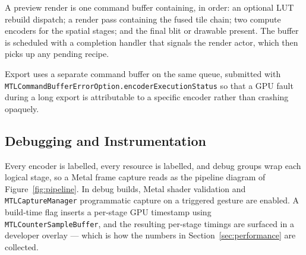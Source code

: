 A preview render is one command buffer containing, in order: an optional LUT
rebuild dispatch; a render pass containing the fused tile chain; two compute
encoders for the spatial stages; and the final blit or drawable present. The
buffer is scheduled with a completion handler that signals the render actor,
which then picks up any pending recipe.

Export uses a separate command buffer on the same queue, submitted with
\texttt{MTLCommandBufferErrorOption.\allowbreak{}encoderExecutionStatus} so that
a GPU fault
during a long export is attributable to a specific encoder rather than crashing
opaquely.

\subsection{Debugging and Instrumentation}

Every encoder is labelled, every resource is labelled, and debug groups wrap
each logical stage, so a Metal frame capture reads as the pipeline diagram of
Figure~\ref{fig:pipeline}. In debug builds, Metal shader validation and
\texttt{MTLCaptureManager} programmatic capture on a triggered gesture are
enabled. A build-time flag inserts a per-stage GPU timestamp using
\texttt{MTLCounterSampleBuffer}, and the resulting per-stage timings are
surfaced in a developer overlay --- which is how the numbers in
Section~\ref{sec:performance} are collected.
